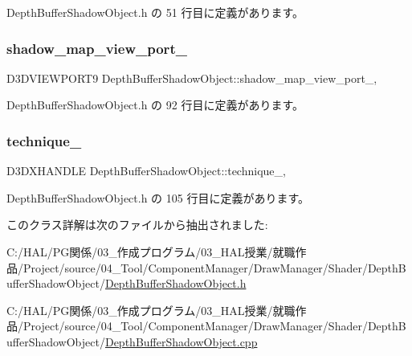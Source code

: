  Depth\+Buffer\+Shadow\+Object.\+h の 51 行目に定義があります。

\mbox{\label{class_depth_buffer_shadow_object_a08c029f49fa8cf59b8458d3c2be0138e}} 
\subsubsection{\texorpdfstring{shadow\+\_\+map\+\_\+view\+\_\+port\+\_\+}{shadow\_map\_view\_port\_}}
{\footnotesize\ttfamily D3\+D\+V\+I\+E\+W\+P\+O\+R\+T9 Depth\+Buffer\+Shadow\+Object\+::shadow\+\_\+map\+\_\+view\+\_\+port\+\_\+\hspace{0.3cm}{\ttfamily [static]}, {\ttfamily [private]}}



 Depth\+Buffer\+Shadow\+Object.\+h の 92 行目に定義があります。

\mbox{\label{class_depth_buffer_shadow_object_ab8fd271667e849ed9dfbdf9de2fe9fa5}} 
\subsubsection{\texorpdfstring{technique\+\_\+}{technique\_}}
{\footnotesize\ttfamily D3\+D\+X\+H\+A\+N\+D\+LE Depth\+Buffer\+Shadow\+Object\+::technique\+\_\+\hspace{0.3cm}{\ttfamily [static]}, {\ttfamily [private]}}



 Depth\+Buffer\+Shadow\+Object.\+h の 105 行目に定義があります。



このクラス詳解は次のファイルから抽出されました\+:\begin{DoxyCompactItemize}
\item 
C\+:/\+H\+A\+L/\+P\+G関係/03\+\_\+作成プログラム/03\+\_\+\+H\+A\+L授業/就職作品/\+Project/source/04\+\_\+\+Tool/\+Component\+Manager/\+Draw\+Manager/\+Shader/\+Depth\+Buffer\+Shadow\+Object/\mbox{\hyperlink{_depth_buffer_shadow_object_8h}{Depth\+Buffer\+Shadow\+Object.\+h}}\item 
C\+:/\+H\+A\+L/\+P\+G関係/03\+\_\+作成プログラム/03\+\_\+\+H\+A\+L授業/就職作品/\+Project/source/04\+\_\+\+Tool/\+Component\+Manager/\+Draw\+Manager/\+Shader/\+Depth\+Buffer\+Shadow\+Object/\mbox{\hyperlink{_depth_buffer_shadow_object_8cpp}{Depth\+Buffer\+Shadow\+Object.\+cpp}}\end{DoxyCompactItemize}
